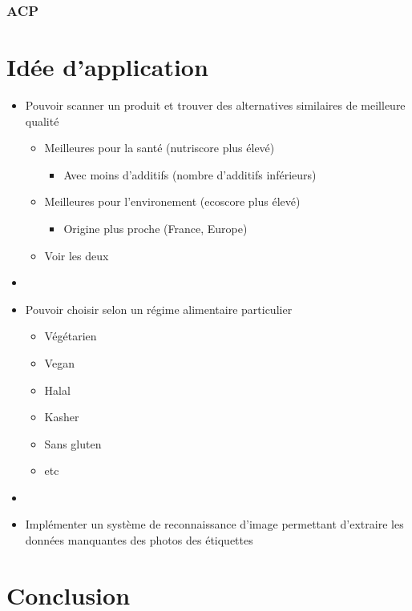 \subsubsection{ACP}
\begin{frame}{\insertsubsubsection}
  
\end{frame}

\section{Idée d'application}
\begin{frame}
  \begin{itemize}
    \item Pouvoir scanner un produit et trouver des alternatives similaires de meilleure qualité
          \begin{itemize}
            \item Meilleures pour la santé (nutriscore plus élevé)
                  \begin{itemize}
                    \item Avec moins d'additifs (nombre d'additifs inférieurs)
                  \end{itemize}
            \item Meilleures pour l'environement (ecoscore plus élevé)
                  \begin{itemize}
                    \item Origine plus proche (France, Europe)
                  \end{itemize}
            \item Voir les deux
          \end{itemize}
    \item[]
    \item Pouvoir choisir selon un régime alimentaire particulier
          \begin{itemize}
            \item Végétarien
            \item Vegan
            \item Halal
            \item Kasher
            \item Sans gluten
            \item etc
          \end{itemize}
    \item[]
    \item[] Implémenter un système de reconnaissance d'image
      permettant d'extraire les données manquantes des photos des étiquettes
  \end{itemize}
\end{frame}

\section{Conclusion}

